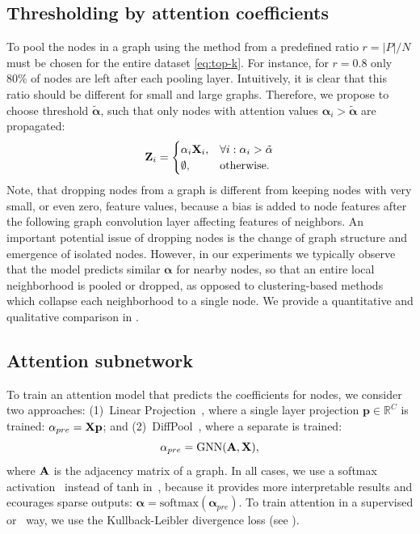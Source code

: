 \subsection{Thresholding by attention coefficients}
To pool the nodes in a graph using the method from\citep{graphunet2018} a predefined ratio $r=|P| / N$ must be chosen for the entire dataset \eqref{eq:top-k}. For instance, for $r=0.8$ only 80\% of nodes are left after each pooling layer. Intuitively, it is clear that this ratio should be different for small and large graphs.
Therefore, we propose to choose threshold $\tilde{\mathbf{\alpha}}$, such that only nodes with attention values $\mathbf{\alpha}_i > \tilde{\mathbf{\alpha}}$ are propagated:
%
\begin{equation}
\label{eq:top-k_ours}
\mathbf{Z}_i =
\begin{cases}
\mathbf{\alpha}_i \mathbf{X}_i,& \forall i: \mathbf{\alpha}_i > \tilde{\mathbf{\alpha}} \\
\emptyset, & \text{otherwise}.
\end{cases}
\end{equation}
%
Note, that dropping nodes from a graph is different from keeping nodes with very small, or even zero, feature values, because a bias is added to node features after the following graph convolution layer affecting features of neighbors. An important potential issue of dropping nodes is the change of graph structure and emergence of isolated nodes. However, in our experiments we typically observe that the model predicts similar $\mathbf{\alpha}$ for nearby nodes, so that an entire local neighborhood is pooled or dropped, as opposed to clustering-based methods which collapse each neighborhood to a single node. We provide a quantitative and qualitative comparison in \secref{\ref{sec:exper}}.

\subsection{Attention subnetwork}
To train an attention model that predicts the coefficients for nodes, we consider two approaches: (1)~Linear Projection~\citep{graphunet2018}, where a single layer projection $\mathbf{p} \in \mathbb{R}^C$ is trained: $\mathbf{\alpha}_{pre} = \mathbf{X} \mathbf{p}$; and (2)~DiffPool~\citep{ying2018hierarchical}, where a separate \gnn is trained:
%
\begin{equation}
\label{eq:attn_gcn}
\mathbf{\alpha}_{pre} = \text{GNN}(\mathbf{A}, \mathbf{X}),
\end{equation}
%
where $\mathbf{A}$ is the adjacency matrix of a graph.
In all cases, we use a softmax activation~\citep{vaswani2017attention,park2016attentive} instead of tanh in~\citep{graphunet2018}, because it provides more interpretable results  and ecourages sparse outputs: $\mathbf{\alpha} = \text{softmax}(\mathbf{\alpha}_{pre})$.
To train attention in a supervised or \wsup~way, we use the Kullback-Leibler divergence loss (see \secref{\ref{sec:arch_train}}).

